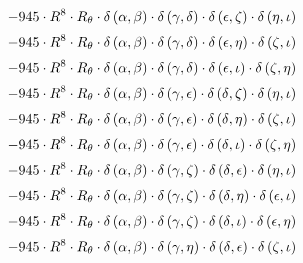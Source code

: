 \begin{subequations}
\begin{gather}
 \\[0.2em] \notag 		 - 945 \cdot R^{8} \cdot R_{\theta{}} \cdot \delta{}\left(\alpha{}, \beta{}\right) \cdot \delta{}\left(\gamma{}, \delta{}\right) \cdot \delta{}\left(\epsilon{}, \zeta{}\right) \cdot \delta{}\left(\eta{}, \iota{}\right) 
 \\[0.2em] \notag 		 - 945 \cdot R^{8} \cdot R_{\theta{}} \cdot \delta{}\left(\alpha{}, \beta{}\right) \cdot \delta{}\left(\gamma{}, \delta{}\right) \cdot \delta{}\left(\epsilon{}, \eta{}\right) \cdot \delta{}\left(\zeta{}, \iota{}\right) 
 \\[0.2em] \notag 		 - 945 \cdot R^{8} \cdot R_{\theta{}} \cdot \delta{}\left(\alpha{}, \beta{}\right) \cdot \delta{}\left(\gamma{}, \delta{}\right) \cdot \delta{}\left(\epsilon{}, \iota{}\right) \cdot \delta{}\left(\zeta{}, \eta{}\right) 
 \\[0.2em] \notag 		 - 945 \cdot R^{8} \cdot R_{\theta{}} \cdot \delta{}\left(\alpha{}, \beta{}\right) \cdot \delta{}\left(\gamma{}, \epsilon{}\right) \cdot \delta{}\left(\delta{}, \zeta{}\right) \cdot \delta{}\left(\eta{}, \iota{}\right) 
 \\[0.2em] \notag 		 - 945 \cdot R^{8} \cdot R_{\theta{}} \cdot \delta{}\left(\alpha{}, \beta{}\right) \cdot \delta{}\left(\gamma{}, \epsilon{}\right) \cdot \delta{}\left(\delta{}, \eta{}\right) \cdot \delta{}\left(\zeta{}, \iota{}\right) 
 \\[0.2em] \notag 		 - 945 \cdot R^{8} \cdot R_{\theta{}} \cdot \delta{}\left(\alpha{}, \beta{}\right) \cdot \delta{}\left(\gamma{}, \epsilon{}\right) \cdot \delta{}\left(\delta{}, \iota{}\right) \cdot \delta{}\left(\zeta{}, \eta{}\right) 
 \\[0.2em] \notag 		 - 945 \cdot R^{8} \cdot R_{\theta{}} \cdot \delta{}\left(\alpha{}, \beta{}\right) \cdot \delta{}\left(\gamma{}, \zeta{}\right) \cdot \delta{}\left(\delta{}, \epsilon{}\right) \cdot \delta{}\left(\eta{}, \iota{}\right) 
 \\[0.2em] \notag 		 - 945 \cdot R^{8} \cdot R_{\theta{}} \cdot \delta{}\left(\alpha{}, \beta{}\right) \cdot \delta{}\left(\gamma{}, \zeta{}\right) \cdot \delta{}\left(\delta{}, \eta{}\right) \cdot \delta{}\left(\epsilon{}, \iota{}\right) 
 \\[0.2em] \notag 		 - 945 \cdot R^{8} \cdot R_{\theta{}} \cdot \delta{}\left(\alpha{}, \beta{}\right) \cdot \delta{}\left(\gamma{}, \zeta{}\right) \cdot \delta{}\left(\delta{}, \iota{}\right) \cdot \delta{}\left(\epsilon{}, \eta{}\right) 
 \\[0.2em] \notag 		 - 945 \cdot R^{8} \cdot R_{\theta{}} \cdot \delta{}\left(\alpha{}, \beta{}\right) \cdot \delta{}\left(\gamma{}, \eta{}\right) \cdot \delta{}\left(\delta{}, \epsilon{}\right) \cdot \delta{}\left(\zeta{}, \iota{}\right) 

\end{gather}
\end{subequations}

